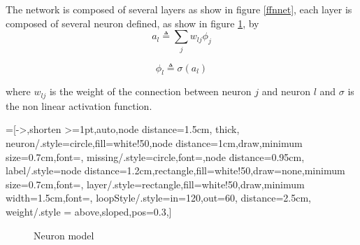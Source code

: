 \documentclass{article}
\begin{document}
The network is composed of several layers as show in figure \ref{ffnnet}, each layer is composed of several neuron defined, as show in figure \ref{neuron_model}, by
\begin{equation}
a_l \triangleq \sum_j w_{lj}\phi_j
\end{equation}

\begin{equation}
\phi_l \triangleq \sigma(a_l)
\end{equation}


where $w_{lj}$ is the weight of the connection between neuron $j$ and neuron $l$ and $\sigma$ is the non linear activation function.


=[->,shorten >=1pt,auto,node distance=1.5cm,
  thick,
  neuron/.style={circle,fill=white!50,node distance=1cm,draw,minimum size=0.7cm,font=\sffamily\Large\bfseries},
  missing/.style={circle,font=\sffamily\Large,node distance=0.95cm},
  label/.style={node distance=1.2cm,rectangle,fill=white!50,draw=none,minimum size=0.7cm,font=\sffamily\normalsize},
  layer/.style={rectangle,fill=white!50,draw,minimum width=1.5cm,font=\sffamily\Large},
  loopStyle/.style={in=120,out=60, distance=2.5cm},
  weight/.style = {above,sloped,pos=0.3},]
\begin{figure}[!h]
 \centering
{}
\caption{Neuron model}
\label{neuron_model}
\end{figure}
\end{document}
